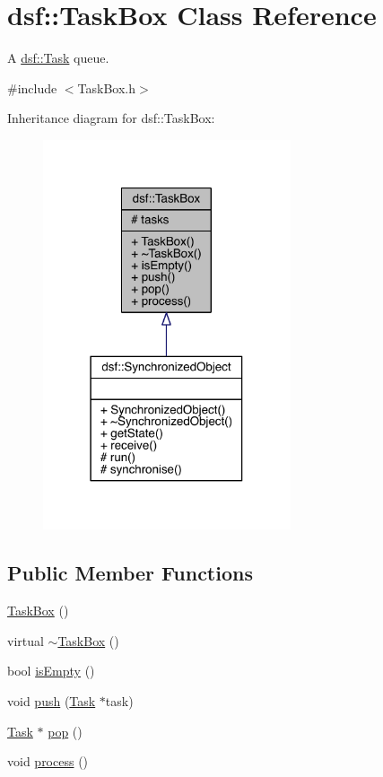 \hypertarget{classdsf_1_1_task_box}{}\section{dsf\+:\+:Task\+Box Class Reference}
\label{classdsf_1_1_task_box}


A \hyperlink{classdsf_1_1_task}{dsf\+::\+Task} queue.  




{\ttfamily \#include $<$Task\+Box.\+h$>$}



Inheritance diagram for dsf\+:\+:Task\+Box\+:\nopagebreak
\begin{figure}[H]
\begin{center}
\leavevmode
\includegraphics[width=207pt]{classdsf_1_1_task_box__inherit__graph}
\end{center}
\end{figure}
\subsection*{Public Member Functions}
\begin{DoxyCompactItemize}
\item 
\hyperlink{classdsf_1_1_task_box_a931c925e0a4956ee6bc1674f43ecc0a0}{Task\+Box} ()
\item 
virtual \hyperlink{classdsf_1_1_task_box_a20684b560a76fc97dd8e3f879ea240df}{$\sim$\+Task\+Box} ()
\item 
bool \hyperlink{classdsf_1_1_task_box_a7e67fd9b7104d24cb4be54f6a48eb8c9}{is\+Empty} ()
\item 
void \hyperlink{classdsf_1_1_task_box_a0ec4e52a625fae00e05b072d6434eef1}{push} (\hyperlink{classdsf_1_1_task}{Task} $\ast$task)
\item 
\hyperlink{classdsf_1_1_task}{Task} $\ast$ \hyperlink{classdsf_1_1_task_box_a656f4778edd42d43ff7516de3fa528ef}{pop} ()
\item 
void \hyperlink{classdsf_1_1_task_box_ad35070ac305146aaa4073b2078d9209e}{process} ()
\end{DoxyCompactItemize}
